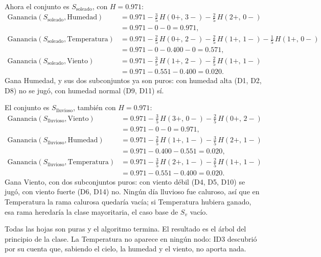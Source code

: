 \documentclass[11pt,letterpaper]{article}
\begin{document}
 Ahora el conjunto es
$S_{\text{soleado}}$, con $H = 0.971$:
\begin{align*}
    \text{Ganancia}(S_{\text{soleado}}, \text{Humedad})
        &= 0.971 - \tfrac{3}{5}\,H(0+,\,3-) - \tfrac{2}{5}\,H(2+,\,0-) \\
        &= 0.971 - 0 - 0 = 0.971 , \\[0.4em]
    \text{Ganancia}(S_{\text{soleado}}, \text{Temperatura})
        &= 0.971 - \tfrac{2}{5}\,H(0+,\,2-) - \tfrac{2}{5}\,H(1+,\,1-)
                 - \tfrac{1}{5}\,H(1+,\,0-) \\
        &= 0.971 - 0 - 0.400 - 0 = 0.571 , \\[0.4em]
    \text{Ganancia}(S_{\text{soleado}}, \text{Viento})
        &= 0.971 - \tfrac{3}{5}\,H(1+,\,2-) - \tfrac{2}{5}\,H(1+,\,1-) \\
        &= 0.971 - 0.551 - 0.400 = 0.020 .
\end{align*}
Gana Humedad, y sus dos subconjuntos ya son puros: con humedad alta
(D1, D2, D8) no se jugó, con humedad normal (D9, D11) sí.

 El conjunto es
$S_{\text{lluvioso}}$, también con $H = 0.971$:
\begin{align*}
    \text{Ganancia}(S_{\text{lluvioso}}, \text{Viento})
        &= 0.971 - \tfrac{3}{5}\,H(3+,\,0-) - \tfrac{2}{5}\,H(0+,\,2-) \\
        &= 0.971 - 0 - 0 = 0.971 , \\[0.4em]
    \text{Ganancia}(S_{\text{lluvioso}}, \text{Humedad})
        &= 0.971 - \tfrac{2}{5}\,H(1+,\,1-) - \tfrac{3}{5}\,H(2+,\,1-) \\
        &= 0.971 - 0.400 - 0.551 = 0.020 , \\[0.4em]
    \text{Ganancia}(S_{\text{lluvioso}}, \text{Temperatura})
        &= 0.971 - \tfrac{3}{5}\,H(2+,\,1-) - \tfrac{2}{5}\,H(1+,\,1-) \\
        &= 0.971 - 0.551 - 0.400 = 0.020 .
\end{align*}
Gana Viento, con dos subconjuntos puros: con viento débil (D4, D5, D10)
se jugó, con viento fuerte (D6, D14) no. Ningún día lluvioso fue
caluroso, así que en Temperatura la rama calurosa quedaría vacía; si
Temperatura hubiera ganado, esa rama heredaría la clase mayoritaria,
el caso base de $S_v$ vacío.

Todas las hojas son puras y el algoritmo termina. El resultado es el
árbol del principio de la clase. La Temperatura no aparece en ningún
nodo: ID3 descubrió por su cuenta que, sabiendo el cielo, la humedad y
el viento, no aporta nada.
\end{document}
